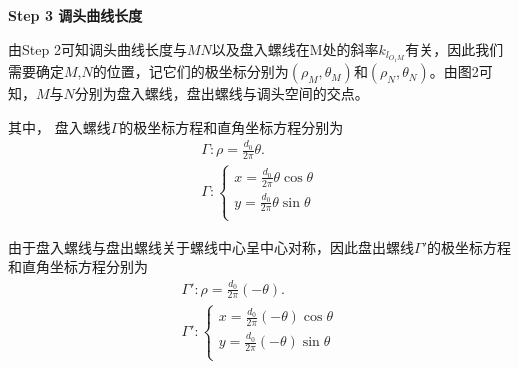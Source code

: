 \documentclass[../main.tex]{subfiles}
\begin{document}
\noindent\textbf{Step 3 调头曲线长度} 
\par 由Step 2可知调头曲线长度与$MN$以及盘入螺线在M处的斜率$k_{l_{O_1M}}$有关，因此我们需要确定$M$,$N$的位置，记它们的极坐标分别为$(\rho_M,\theta_M)$和$(\rho_N,\theta_N)$。由图2可知，$M$与$N$分别为盘入螺线，盘出螺线与调头空间的交点。
\par 其中， 盘入螺线\(\varGamma\)的极坐标方程和直角坐标方程分别为
\begin{gather}
\varGamma :\rho =\frac{d_0}{2\pi}\theta.\label{7.3.1}
\\
\varGamma :\begin{cases}\label{7.4.1}
x=\frac{d_0}{2\pi}\theta \cos \theta\\
y=\frac{d_0}{2\pi}\theta \sin \theta\\
\end{cases}
\end{gather}

\par 由于盘入螺线与盘出螺线关于螺线中心呈中心对称，因此盘出螺线$\varGamma'$的极坐标方程和直角坐标方程分别为
\begin{gather}
\varGamma':\rho =\frac{d_0}{2\pi}\left( -\theta \right) .\label{7.3.2}  \\
\varGamma':\begin{cases}\label{7.4.2}
x=\frac{d_0}{2\pi}\left( -\theta \right) \cos \theta\\
y=\frac{d_0}{2\pi}\left( -\theta \right) \sin \theta\\
\end{cases}
\end{gather}
\end{document}
